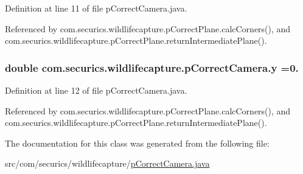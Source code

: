 Definition at line 11 of file p\+Correct\+Camera.\+java.



Referenced by com.\+securics.\+wildlifecapture.\+p\+Correct\+Plane.\+calc\+Corners(), and com.\+securics.\+wildlifecapture.\+p\+Correct\+Plane.\+return\+Intermediate\+Plane().

\hypertarget{classcom_1_1securics_1_1wildlifecapture_1_1p_correct_camera_ad1cb4ae4ced9de56b6c63664dac3f070}{
\subsubsection[{y}]{\setlength{\rightskip}{0pt plus 5cm}double com.\+securics.\+wildlifecapture.\+p\+Correct\+Camera.\+y =0.}}\label{classcom_1_1securics_1_1wildlifecapture_1_1p_correct_camera_ad1cb4ae4ced9de56b6c63664dac3f070}


Definition at line 12 of file p\+Correct\+Camera.\+java.



Referenced by com.\+securics.\+wildlifecapture.\+p\+Correct\+Plane.\+calc\+Corners(), and com.\+securics.\+wildlifecapture.\+p\+Correct\+Plane.\+return\+Intermediate\+Plane().



The documentation for this class was generated from the following file\+:\begin{DoxyCompactItemize}
\item 
src/com/securics/wildlifecapture/\hyperlink{p_correct_camera_8java}{p\+Correct\+Camera.\+java}\end{DoxyCompactItemize}
